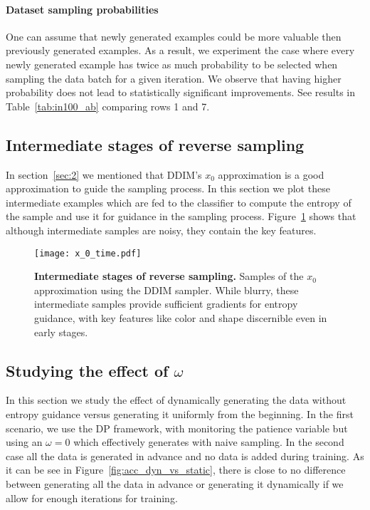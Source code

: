 \paragraph{Dataset sampling probabilities}
One can assume that newly generated examples could be more valuable then previously generated examples. As a result, we experiment the case where every newly generated example has twice as much probability to be selected when sampling the data batch for a given iteration. We observe that having higher probability does not lead to statistically significant improvements. See results in Table~\ref{tab:in100_ab} comparing rows 1 and 7.

    
\subsection{Intermediate stages of reverse sampling}
In section~\ref{sec:2} we mentioned that DDIM's $x_0$ approximation is a good approximation to guide the sampling process. In this section we plot these intermediate examples which are fed to the classifier to compute the entropy of the sample and use it for guidance in the sampling process. Figure~\ref{fig:intermediate-sampling} shows that although intermediate samples are noisy, they contain the key features. 
\begin{figure}
    \centering
    \texttt{[image: x\_0\_time.pdf]}
    \caption{\textbf{Intermediate stages of reverse sampling.} Samples of the $x_0$ approximation using the DDIM sampler. While blurry, these intermediate samples provide sufficient gradients for entropy guidance, with key features like color and shape discernible even in early stages.
    }\label{fig:intermediate-sampling}
\end{figure}

\subsection{Studying the effect of $\omega$}
In this section we study the effect of dynamically generating the data without entropy guidance versus generating it uniformly from the beginning. In the first scenario, we use the DP framework, with monitoring the patience variable but using an $\omega=0$ which effectively generates with naive sampling. In the second case all the data is generated in advance and no data is added during training. As it can be see in Figure~\ref{fig:acc_dyn_vs_static}, there is close to no difference between generating all the data in advance or generating it dynamically if we allow for enough iterations for training. 

